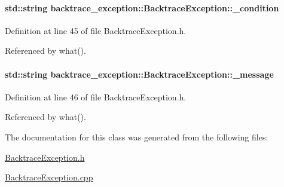 \paragraph[{\texorpdfstring{\+\_\+condition}{_condition}}]{\setlength{\rightskip}{0pt plus 5cm}std\+::string backtrace\+\_\+exception\+::\+Backtrace\+Exception\+::\+\_\+condition\hspace{0.3cm}{\ttfamily [protected]}}\hypertarget{classbacktrace__exception_1_1BacktraceException_a3e43ec7625a2390fdfad8fffd4ab126c}{}\label{classbacktrace__exception_1_1BacktraceException_a3e43ec7625a2390fdfad8fffd4ab126c}


Definition at line 45 of file Backtrace\+Exception.\+h.



Referenced by what().

\paragraph[{\texorpdfstring{\+\_\+message}{_message}}]{\setlength{\rightskip}{0pt plus 5cm}std\+::string backtrace\+\_\+exception\+::\+Backtrace\+Exception\+::\+\_\+message\hspace{0.3cm}{\ttfamily [protected]}}\hypertarget{classbacktrace__exception_1_1BacktraceException_a34f27c079bfdf70ceb66875f3bb7d599}{}\label{classbacktrace__exception_1_1BacktraceException_a34f27c079bfdf70ceb66875f3bb7d599}


Definition at line 46 of file Backtrace\+Exception.\+h.



Referenced by what().



The documentation for this class was generated from the following files\+:\begin{DoxyCompactItemize}
\item 
\hyperlink{BacktraceException_8h}{Backtrace\+Exception.\+h}\item 
\hyperlink{BacktraceException_8cpp}{Backtrace\+Exception.\+cpp}\end{DoxyCompactItemize}
